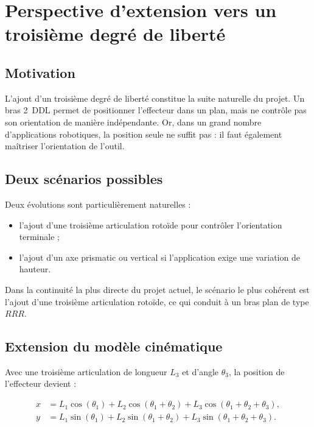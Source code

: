 \documentclass[12pt,a4paper]{report}
\newcommand{\Lone}{L_1}
\newcommand{\Ltwo}{L_2}
\newcommand{\Lthree}{L_3}
\newcommand{\thone}{\theta_1}
\newcommand{\thtwo}{\theta_2}
\newcommand{\ththree}{\theta_3}
\newcommand{\ddof}{2~DDL}
\begin{document}
\chapter{Perspective d'extension vers un troisième degré de liberté}\label{chap:perspectives}

\section{Motivation}

L'ajout d'un troisième degré de liberté constitue la suite naturelle du projet. Un bras
\ddof{} permet de positionner l'effecteur dans un plan, mais ne contrôle pas son
orientation de manière indépendante. Or, dans un grand nombre d'applications robotiques,
la position seule ne suffit pas : il faut également maîtriser l'orientation de l'outil.

\section{Deux scénarios possibles}

Deux évolutions sont particulièrement naturelles :

\begin{itemize}
    \item l'ajout d'une troisième articulation rotoïde pour contrôler l'orientation terminale ;
    \item l'ajout d'un axe prismatic ou vertical si l'application exige une variation de hauteur.
\end{itemize}

Dans la continuité la plus directe du projet actuel, le scénario le plus cohérent est
l'ajout d'une troisième articulation rotoïde, ce qui conduit à un bras plan de type $RRR$.

\section{Extension du modèle cinématique}

Avec une troisième articulation de longueur $\Lthree$ et d'angle $\ththree$, la position
de l'effecteur devient :

\begin{align}
    x &= \Lone \cos(\thone)
    + \Ltwo \cos(\thone+\thtwo)
    + L_3 \cos(\thone+\thtwo+\ththree), \\
    y &= \Lone \sin(\thone)
    + \Ltwo \sin(\thone+\thtwo)
    + L_3 \sin(\thone+\thtwo+\ththree).
\end{align}
\end{document}
